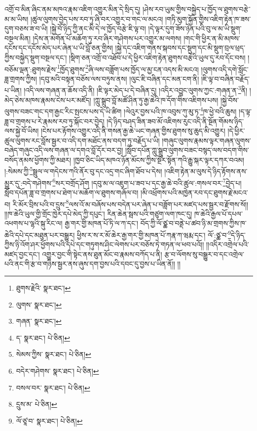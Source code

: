 འགྲོ་བ་མིན་ཞིང་ནམ་མཁའ་རྣམ་འཇིག་འགྱུར་མིན་དེ་སྲིད་དུ། །ཤེས་རབ་ཡུམ་གྱིས་བསྐྱེད་པ་ཁྱོད་ལ་ཐུགས་བརྩེ་མ་མ་ཡིས། །ཚུལ་ལུགས་བྱེད་པས་རབ་ཏུ་ཞི་བར་འགྱུར་བ་གང་ལ་མངའ། །གཏི་མུག་སྐྱོན་གྱིས་འཇིག་རྟེན་ཁ་ཟས་དུག་བཅས་ཟ་བ་ཡི། །སྐྱེ་བོ་ཉིད་ཀྱི་ནང་མི་དེ་ལ་ཁྱོད་བརྩེ་ཇི་ལྟ་བ། །དེ་ལྟར་དུག་ཟོས་ཉེན་པའི་བུ་ལ་མ་ཡི་སྡུག་བསྔལ་མིན། །དེས་ན་མགོན་པོ་མཆོག་ཏུ་རབ་ཞིར་གཤེགས་པར་འགྱུར་མ་ལགས། །གང་གི་ཕྱིར་ན་མི་མཁས་དངོས་དང་དངོས་མེད་པར་ཞེན་པ་ཡི་བློ་ཅན་གྱིས། །སྐྱེ་དང་འཇིག་གནས་སྐབས་དང་སྡུག་དང་མི་སྡུག་བྲལ་ཕྲད་ཀྱིས་བསྐྱེད་སྡུག་བསྔལ་དང་། །སྡིག་ཅན་འགྲོ་བ་འཐོབ་པ་དེ་ཕྱིར་འཇིག་རྟེན་ཐུགས་བརྩེའི་ཡུལ་དུ་རབ་དོང་བས། །བཅོམ་ལྡན་:ཐུགས་རྗེས་\footnote{ཐུགས་རྗེའི་  སྣར་ཐང་། }ཁྱོད་ཐུགས་\footnote{ལུགས་  སྣར་ཐང་། }ཞི་ལས་བཟློག་པས་ཁྱོད་ལ་མྱ་ངན་འདས་མི་མངའ། །ལུགས་འདི་དགེ་སློང་ཟླ་གྲགས་ཀྱིས། །དབུ་མའི་བསྟན་བཅོས་ལས་བཏུས་ནས། །ལུང་ཇི་བཞིན་དང་མན་ངག་ནི། །ཇི་ལྟ་བ་བཞིན་བརྗོད་པ་ཡིན། །འདི་ལས་གཞན་ན་ཆོས་འདི་ནི། །ཇི་ལྟར་མེད་པ་དེ་བཞིན་དུ། །འདིར་འབྱུང་ལུགས་ཀྱང་:གཞན་ན་\footnote{གཞན་  སྣར་ཐང་། }ནི། །མེད་ཅེས་མཁས་རྣམས་ངེས་པར་མཛོད། །ཀླུ་སྒྲུབ་བློ་མཚོ་ཤིན་ཏུ་རྒྱ་ཆེའི་ཁ་དོག་གིས་འཇིགས་པས། །སྐྱེ་བོས་ལུགས་བཟང་གང་དག་རྒྱང་རིང་སྤངས་པས་དེ་ཡི་ཚིག །ལེའུར་བྱས་པའི་ཁ་འབུས་ཀུ་མུ་ཏ་\footnote{ད་  སྣར་ཐང་།  པེ་ཅིན། }ཁ་ཕྱེ་བའི་ཆུས། །ད་ལྟ་ཟླ་བ་གྲགས་པ་རེ་རྣམས་རབ་ཏུ་སྐོང་བར་བྱེད། །དེ་ཉིད་བཤད་ཟིན་ཟབ་མོ་འཇིགས་རུང་འདི་ནི་སྔོན་གོམས་ཉིད་ལས་སྐྱེ་བོ་ཡིས། །ངེས་པར་རྟོགས་འགྱུར་འདི་ནི་གསན་རྒྱ་ཆེ་ཡང་གཞན་གྱིས་ཐུགས་སུ་ཆུད་མི་འགྱུར། །དེ་ཕྱིར་ཚུལ་ལུགས་རང་བློས་སྦྱར་བ་འདི་དག་མཐོང་ནས་བདག་ཏུ་བརྗོད་པ་ཡི། །གཞུང་ལུགས་རྣམས་ལྟར་གཞན་ལུགས་བཞེད་གཞུང་འདི་ལས་གཞན་ལ་དགའ་བློ་དོར་བར་བྱ། །སློབ་དཔོན་ཀླུ་སྒྲུབ་ལུགས་བཟང་བསྙད་ལས་བདག་གིས་བསོད་ནམས་ཕྱོགས་ཀྱི་མཐར། །ཁྱབ་ཅིང་ཡིད་མཁའ་ཉོན་མོངས་ཀྱིས་སྔོར་སྟོན་ཀའི་རྒྱུ་སྐར་ལྟར་དཀར་བའམ། །:སེམས་ཀྱི་\footnote{སེམས་ཀྱིས་  སྣར་ཐང་།  པེ་ཅིན། }སྦྲུལ་ལ་གདེངས་ཀའི་ནོར་བུ་དང་འདྲ་གང་ཞིག་ཐོབ་པ་དེས། །འཇིག་རྟེན་མ་ལུས་དེ་ཉིད་རྟོགས་ནས་མྱུར་དུ་:བདེ་གཤེགས་\footnote{བདེར་གཤེགས་  སྣར་ཐང་།  པེ་ཅིན། }སར་བགྲོད་ཤོག །དབུ་མ་ལ་འཇུག་པ་ཟབ་པ་དང་རྒྱ་ཆེ་བའི་ཚུལ་:གསལ་བར་\footnote{བསལ་བར་  སྣར་ཐང་།  པེ་ཅིན། }བྱེད་པ། སློབ་དཔོན་ཟླ་བ་གྲགས་པ་ཐེག་པ་མཆོག་ལ་ཐུགས་གཞོལ་བ། །མི་འཕྲོགས་པའི་མཁྱེན་རབ་དང་ཐུགས་རྗེ་མངའ་བ། རི་མོར་བྲིས་པའི་བ་དྲུས་\footnote{དྲུས་མ་  པེ་ཅིན། }ལས་འོ་མ་བཞོས་པས་བདེན་པར་ཞེན་པ་བཟློག་པར་མཛད་པས་སྦྱར་བ་རྫོགས་སོ།། །།ཁ་ཆེའི་ཡུལ་གྱི་གྲོང་ཁྱེར་དཔེ་མེད་ཀྱི་དཔུང་། རིན་ཆེན་སྦས་པའི་གཙུག་ལག་ཁང་དུ། ཁ་ཆེའི་རྒྱལ་པོ་དཔལ་འཕགས་པ་ལྷའི་སྐུ་རིང་ལ། རྒྱ་གར་གྱི་མཁན་པོ་ཏི་ལ་ཀ་དང་། བོད་ཀྱི་ལོ་ཙྪ་བ་བནྡེ་པ་ཚབ་ཉི་མ་གྲགས་ཀྱིས་ཁ་ཆེའི་དཔེ་དང་མཐུན་པར་བསྒྱུར། ཕྱིས་ར་ས་ར་མོ་ཆེར་རྒྱ་གར་གྱི་མཁན་པོ་ཀརྣ་ཀ་ཝརྨ་དང་། ལོ་:ཙྪ་བ་\footnote{ལོ་ཙཱ་བ་  སྣར་ཐང་།  པེ་ཅིན། }དེ་ཉིད་ཀྱིས་ཉི་འོག་ཤར་ཕྱོགས་པའི་དཔེ་དང་གཏུགས་ཤིང་ལེགས་པར་བཅོས་ཏེ་གཏན་ལ་ཕབ་པའོ།། །།འདིར་འགྲེལ་པའི་མཛད་བྱང་དང་། འགྱུར་བྱང་གི་སྟེང་ནས་ཐུན་མོང་བ་རྣམས་བཀོད་པ་ནི། རྩ་བ་ལོགས་སུ་བསྒྱུར་བ་དང་འགྲེལ་པའི་ནང་གི་རྩ་བ་གཉིས་སྦྱར་ནས་ཞུས་དག་བྱས་པའི་དབང་དུ་བྱས་པ་ཡིན་ནོ།། །།